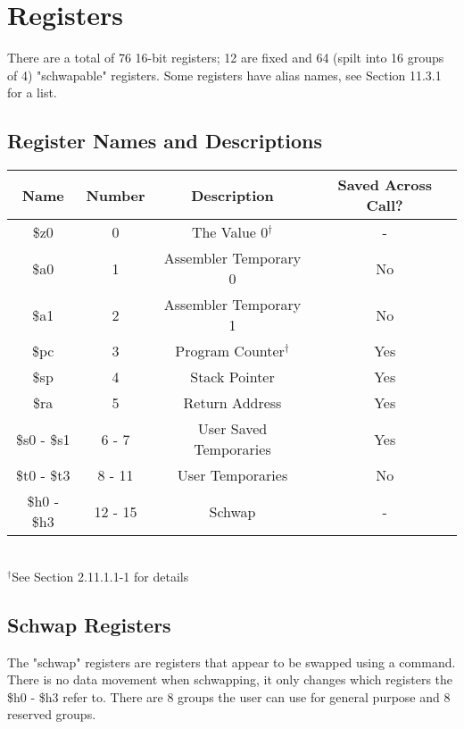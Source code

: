 \section{Registers}
	There are a total of 76 16-bit registers; 12 are fixed and 64 (spilt into 16 groups of 4) "schwapable" registers.  Some registers have alias names, see Section 11.3.1 for a list.
	\subsection{Register Names and Descriptions}
		\begin{center}
			\begin{tabular}{| c | c | c | c |} \hline
				Name        & Number  & Description            & Saved Across Call? \\ \hline
				\$z0        & 0       & The Value 0$^\dagger$  & -   \\ \hline
				\$a0        & 1       & Assembler Temporary 0  & No  \\ \hline
				\$a1        & 2       & Assembler Temporary 1  & No  \\ \hline
				\$pc        & 3       & Program Counter$^\dagger$&Yes\\ \hline
				\$sp        & 4       & Stack Pointer          & Yes \\ \hline
				\$ra        & 5       & Return Address         & Yes \\ \hline
				\$s0 - \$s1 & 6 - 7   & User Saved Temporaries & Yes \\ \hline
				\$t0 - \$t3 & 8 - 11  & User Temporaries       & No  \\ \hline
				\$h0 - \$h3 & 12 - 15 & Schwap                 & -   \\ \hline
			\end{tabular} \\
			$^\dagger$See Section 2.11.1.1-1 for details
		\end{center}
	\subsection{Schwap Registers}
		The "schwap" registers are registers that appear to be swapped using a command.  There is no data movement when schwapping, it only changes which registers the \$h0 - \$h3 refer to.  There are 8 groups the user can use for general purpose and 8 reserved groups.
